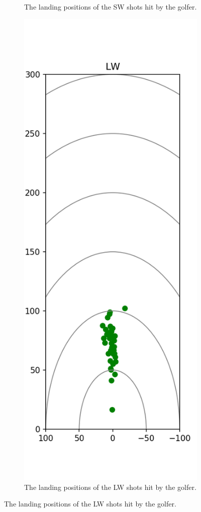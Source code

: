 \documentclass{kththesis}
\begin{document}
\begin{figure}
\begin{subfigure}{0.4\textwidth}
    \caption{The landing positions of the SW shots hit by the golfer.}
    \label{fig:SW_shots}
    \end{subfigure}
    \begin{subfigure}{0.4\textwidth}
    \centering
    \includegraphics[height=0.4\textheight]{Shots/LW_shots.png} 
    \caption{The landing positions of the LW shots hit by the golfer.}
    \label{fig:LW_shots}
    \end{subfigure}
\end{figure}
\end{document}
